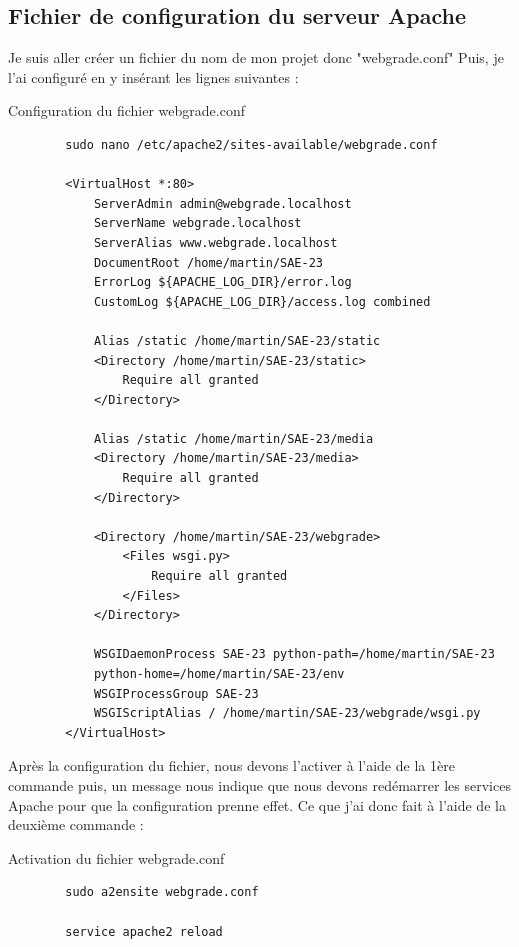 \documentclass[12pt, a4paper]{article}
\begin{document}
    \subsection{Fichier de configuration du serveur Apache}
    Je suis aller créer un fichier du nom de mon projet donc "webgrade.conf" 
    Puis, je l'ai configuré en y insérant les lignes suivantes :
    \begin{listing}[H]
        \caption{Configuration du fichier webgrade.conf }
        \label{lst:conf}
        \begin{verbatim}
        sudo nano /etc/apache2/sites-available/webgrade.conf

        <VirtualHost *:80>
            ServerAdmin admin@webgrade.localhost
            ServerName webgrade.localhost
            ServerAlias www.webgrade.localhost
            DocumentRoot /home/martin/SAE-23
            ErrorLog ${APACHE_LOG_DIR}/error.log
            CustomLog ${APACHE_LOG_DIR}/access.log combined

            Alias /static /home/martin/SAE-23/static
            <Directory /home/martin/SAE-23/static>
                Require all granted
            </Directory>

            Alias /static /home/martin/SAE-23/media
            <Directory /home/martin/SAE-23/media>
                Require all granted
            </Directory>

            <Directory /home/martin/SAE-23/webgrade>
                <Files wsgi.py>
                    Require all granted
                </Files>
            </Directory>

            WSGIDaemonProcess SAE-23 python-path=/home/martin/SAE-23 
            python-home=/home/martin/SAE-23/env
            WSGIProcessGroup SAE-23
            WSGIScriptAlias / /home/martin/SAE-23/webgrade/wsgi.py
        </VirtualHost>
        \end{verbatim}
    \end{listing}
    \newpage
    Après la configuration du fichier, nous devons l'activer à l'aide
    de la 1ère commande puis, un message nous indique que nous devons 
    redémarrer les services Apache pour que la configuration prenne effet. 
    Ce que j'ai donc fait à l'aide de la deuxième commande : 
    \begin{listing}[H]
        \caption{Activation du fichier webgrade.conf }
        \label{lst:activer}
        \begin{verbatim}
        sudo a2ensite webgrade.conf

        service apache2 reload
        \end{verbatim}
    \end{listing}
\end{document}

